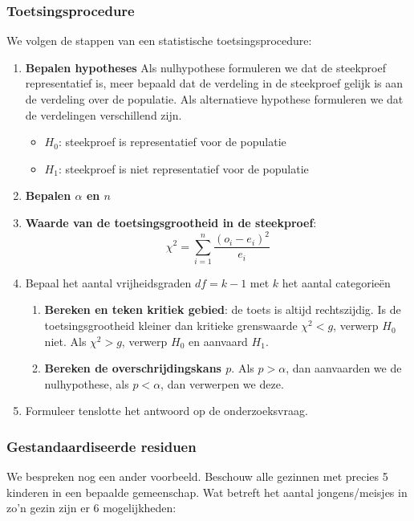 \subsubsection{Toetsingsprocedure}

We volgen de stappen van een statistische toetsingsprocedure:

\begin{enumerate}
  \item \textbf{Bepalen hypotheses}
  Als nulhypothese formuleren we dat de steekproef representatief is, meer bepaald dat de verdeling in de steekproef gelijk is aan de verdeling over de populatie. Als alternatieve hypothese formuleren we dat de verdelingen verschillend zijn.
  \begin{itemize}
    \item $H_{0}$: steekproef is representatief voor de populatie
    \item $H_{1}$: steekproef is niet representatief voor de populatie
  \end{itemize}
  \item \textbf{Bepalen $\alpha$ en $n$}
  \item \textbf{Waarde van de toetsingsgrootheid in de steekproef}:
  \[ \chi^{2} = \sum_{i=1}^{n} \frac{(o_{i} - e_{i})^{2}}{e_{i}} \]
  \item Bepaal het aantal vrijheidsgraden $df = k - 1$ met $k$ het aantal categorieën
  \begin{enumerate}
    \item \textbf{Bereken en teken kritiek gebied}: de toets is altijd rechtszijdig. Is de toetsingsgrootheid kleiner dan kritieke grenswaarde $\chi^2 < g$, verwerp $H_{0}$ niet. Als $\chi^2 > g$, verwerp $H_{0}$ en aanvaard $H_{1}$.
    \item \textbf{Bereken de overschrijdingskans $p$}. Als $p > \alpha$, dan aanvaarden we de nulhypothese, als $p < \alpha$, dan verwerpen we deze.
  \end{enumerate}
  \item Formuleer tenslotte het antwoord op de onderzoeksvraag.
\end{enumerate}

\subsubsection{Gestandaardiseerde residuen}

We bespreken nog een ander voorbeeld. Beschouw alle gezinnen met precies 5 kinderen in een bepaalde gemeenschap. Wat betreft het aantal jongens/meisjes in zo'n gezin zijn er 6 mogelijkheden:

